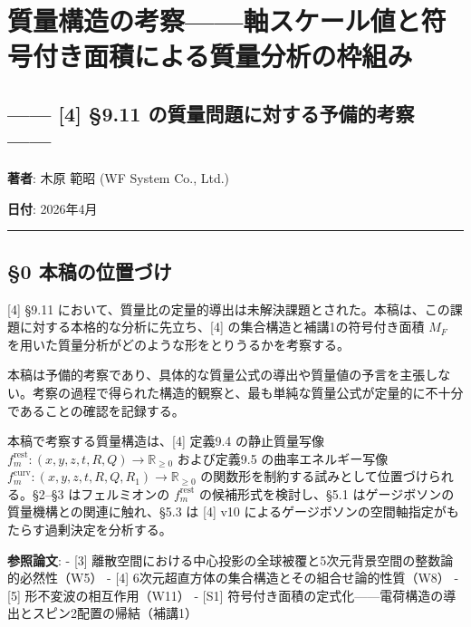 \documentclass[
  a4paper,11pt]{ltjsarticle}
\author{}
\date{}
\begin{document}
\section{質量構造の考察------軸スケール値と符号付き面積による質量分析の枠組み}\label{ux8ceaux91cfux69cbux9020ux306eux8003ux5bdfux8ef8ux30b9ux30b1ux30fcux30ebux5024ux3068ux7b26ux53f7ux4ed8ux304dux9762ux7a4dux306bux3088ux308bux8ceaux91cfux5206ux6790ux306eux67a0ux7d44ux307f}

\subsection{------ {[}4{]} §9.11 の質量問題に対する予備的考察
------}\label{ux306eux8ceaux91cfux554fux984cux306bux5bfeux3059ux308bux4e88ux5099ux7684ux8003ux5bdf}

\textbf{著者}: 木原 範昭 (WF System Co., Ltd.)

\textbf{日付}: 2026年4月

\begin{center}\rule{0.5\linewidth}{0.5pt}\end{center}

\subsection{§0
本稿の位置づけ}\label{ux672cux7a3fux306eux4f4dux7f6eux3065ux3051}

{[}4{]} §9.11
において、質量比の定量的導出は未解決課題とされた。本稿は、この課題に対する本格的な分析に先立ち、{[}4{]}
の集合構造と補講1の符号付き面積 \(M_F\)
を用いた質量分析がどのような形をとりうるかを考察する。

本稿は予備的考察であり、具体的な質量公式の導出や質量値の予言を主張しない。考察の過程で得られた構造的観察と、最も単純な質量公式が定量的に不十分であることの確認を記録する。

本稿で考察する質量構造は、{[}4{]} 定義9.4 の静止質量写像
\(f_m^{\text{rest}}: (x, y, z, t, R, Q) \to \mathbb{R}_{\geq 0}\)
および定義9.5 の曲率エネルギー写像
\(f_m^{\text{curv}}: (x, y, z, t, R, Q, R_1) \to \mathbb{R}_{\geq 0}\)
の関数形を制約する試みとして位置づけられる。§2--§3 はフェルミオンの
\(f_m^{\text{rest}}\) の候補形式を検討し、§5.1
はゲージボソンの質量機構との関連に触れ、§5.3 は {[}4{]} v10
によるゲージボソンの空間軸指定がもたらす過剰決定を分析する。

\textbf{参照論文}: - {[}3{]}
離散空間における中心投影の全球被覆と5次元背景空間の整数論的必然性（W5）
- {[}4{]} 6次元超直方体の集合構造とその組合せ論的性質（W8） - {[}5{]}
形不変波の相互作用（W11） - {[}S1{]}
符号付き面積の定式化------電荷構造の導出とスピン2配置の帰結（補講1）
\end{document}

